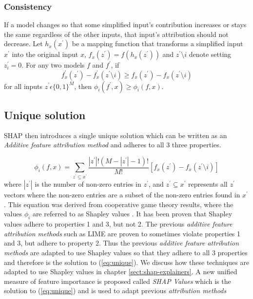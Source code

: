 \subsubsection{Consistency}
 If a model changes so that some simplified input’s contribution increases or stays the same regardless of the other inputs, that input’s attribution should not decrease. Let $h_x(x^{'})$ be a mapping function that transforms a simplified input $x^{'}$ into the original input $x$, $f_{x}(z^{'}) = f(h_{x}(z^{'}))$ and $z^{'} \setminus i$ denote setting $z_{i}^{'} = 0$. For any two models $f$ and $f^{'}$, if
 \begin{equation}
    f^{'}_{x}(z^{'}) - f^{'}_{x}(z^{'} \setminus i) \geq f_{x}(z^{'}) -  f_{x}(z^{'} \setminus i)
    \label{eq:consistency}
 \end{equation}
 for all inputs $z^{'} \epsilon\{0, 1\}^{M}$, then $\phi_{i}(f^{'}, x) \geq \phi_{i}(f, x)$.
 
 \subsection{Unique solution}
 
SHAP then introduces a single unique solution which can be written as an  \emph{Additive feature attribution method} and adheres to all 3 three properties.

\begin{equation}
    \phi_{i}(f, x) = \sum\limits_{z^{'} \subseteq x^{'}} \frac{|z^{'}|!(M - |z^{'}| - 1)!}{M!}[f_{x}(z^{'}) - f_{x}(z^{'} \setminus i)]    
    \label{eq:unique}
\end{equation}
where $|z^{'}|$ is the number of non-zero entries in $z^{'}$, and $z^{'} \subseteq x^{'}$ represents all $z^{'}$ vectors where the non-zero entries are a subset of the non-zero entries found in $x^{'}$.
This equation was derived from cooperative game theory results, where the values $\phi_{i}$ are referred to as Shapley values \cite{Shapley1952value}. It has been proven that Shapley values adhere to properties 1 and 3, but not 2. The previous \emph{additive feature attribution methods} such as LIME are proven to sometimes violate properties 1 and 3, but adhere to property 2. Thus the previous \emph{additive feature attribution methods} are adapted to use Shapley values so that they adhere to all 3 properties and therefore is the solution to (\ref{eq:unique}). We discuss how these techniques are adapted to use Shapley values in chapter \ref{sect:shap-explainers}. A new unified measure of feature importance is proposed called \emph{SHAP Values}  \cite{NIPS2017_7062} which is the solution to (\ref{eq:unique}) and is used to adapt previous \emph{attribution methods}

